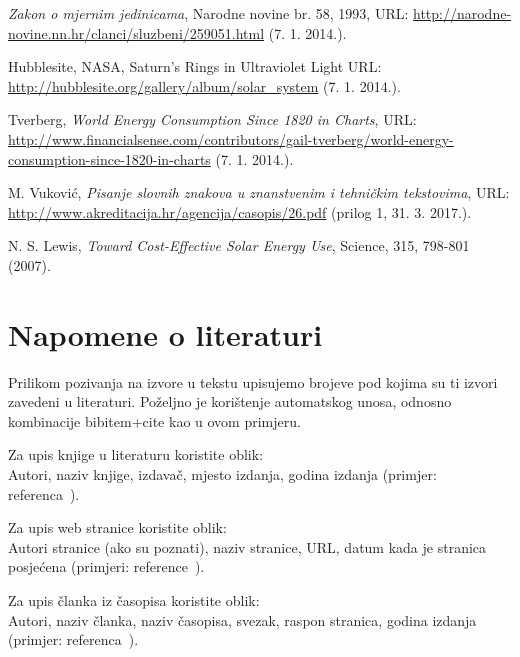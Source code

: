 \documentclass[12pt,a4paper,oneside]{article}
\begin{document}
\begin{linenumbers}
{\begin{thebibliography}{99}
				\textit{Zakon o mjernim jedinicama}, Narodne novine br. 58, 1993, URL: \url{http://narodne-novine.nn.hr/clanci/sluzbeni/259051.html} (7. 1. 2014.).
				
				Hubblesite, NASA, Saturn's Rings in Ultraviolet Light
				URL: \url{http://hubblesite.org/gallery/album/solar_system} (7. 1. 2014.).
				
				Tverberg, \textit{World Energy Consumption Since 1820 in Charts}, URL: \url{http://www.financialsense.com/contributors/gail-tverberg/world-energy-consumption-since-1820-in-charts} (7. 1. 2014.).
				
				M. Vuković, \textit{Pisanje slovnih znakova u znanstvenim i tehničkim tekstovima}, URL: \url{http://www.akreditacija.hr/agencija/casopis/26.pdf} (prilog 1, 31. 3. 2017.).
				
				N. S. Lewis, \textit{Toward Cost-Effective Solar Energy Use}, Science, 315, 798-801 (2007).
			\end{thebibliography}
		}
		
		\newpage \appendix
		\section{Napomene o literaturi}
		Prilikom pozivanja na izvore u tekstu upisujemo brojeve pod kojima su ti izvori zavedeni u literaturi. Poželjno je korištenje automatskog unosa, odnosno kombinacije {\color{red}bibitem+cite} kao u ovom primjeru.
		
		Za upis knjige u literaturu koristite oblik:\\ Autori, naziv knjige, izdavač, mjesto izdanja, godina izdanja (primjer: referenca~\cite{pr1}).
		
		Za upis web stranice koristite oblik:\\ Autori stranice (ako su poznati), naziv stranice, URL, datum kada je stranica posjećena (pri\-mjeri: reference~\cite{struna,jedinice,NASA,web1,formule}).
		
		Za upis članka iz časopisa koristite oblik:\\ Autori, naziv članka, naziv časopisa, svezak, raspon stranica, godina izdanja (primjer: refe\-renca~\cite{web2}).
		
	\end{linenumbers}
\end{document}
